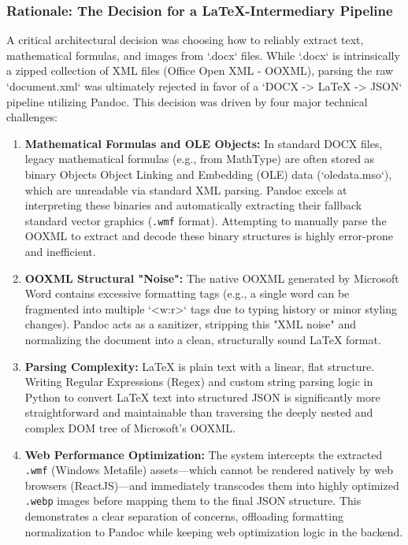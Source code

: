 \subsubsection{Rationale: The Decision for a LaTeX-Intermediary Pipeline}
A critical architectural decision was choosing how to reliably extract text, mathematical formulas, and images from `.docx` files. While `.docx` is intrinsically a zipped collection of XML files (Office Open XML - OOXML), parsing the raw `document.xml` was ultimately rejected in favor of a `DOCX -> LaTeX -> JSON` pipeline utilizing Pandoc. This decision was driven by four major technical challenges:

\begin{enumerate}
    \item \textbf{Mathematical Formulas and OLE Objects:} In standard DOCX files, legacy mathematical formulas (e.g., from MathType) are often stored as binary Objects Object Linking and Embedding (OLE) data (`oledata.mso`), which are unreadable via standard XML parsing. Pandoc excels at interpreting these binaries and automatically extracting their fallback standard vector graphics (\texttt{.wmf} format). Attempting to manually parse the OOXML to extract and decode these binary structures is highly error-prone and inefficient.
    \item \textbf{OOXML Structural "Noise":} The native OOXML generated by Microsoft Word contains excessive formatting tags (e.g., a single word can be fragmented into multiple `<w:r>` tags due to typing history or minor styling changes). Pandoc acts as a sanitizer, stripping this "XML noise" and normalizing the document into a clean, structurally sound LaTeX format.
    \item \textbf{Parsing Complexity:} LaTeX is plain text with a linear, flat structure. Writing Regular Expressions (Regex) and custom string parsing logic in Python to convert LaTeX text into structured JSON is significantly more straightforward and maintainable than traversing the deeply nested and complex DOM tree of Microsoft's OOXML.
    \item \textbf{Web Performance Optimization:} The system intercepts the extracted \texttt{.wmf} (Windows Metafile) assets—which cannot be rendered natively by web browsers (ReactJS)—and immediately transcodes them into highly optimized \texttt{.webp} images before mapping them to the final JSON structure. This demonstrates a clear separation of concerns, offloading formatting normalization to Pandoc while keeping web optimization logic in the backend.
\end{enumerate}


